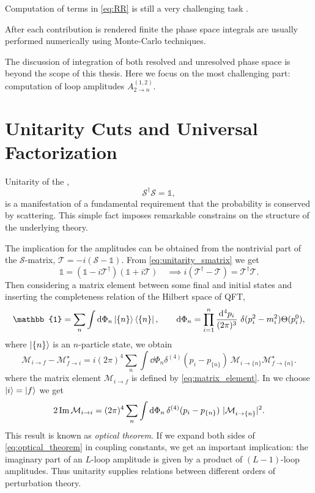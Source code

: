 Computation of terms in \eqref{eq:RR} is still a very challenging task .

After each contribution is rendered finite the phase space integrals are usually performed numerically using Monte-Carlo techniques.

The discussion of integration of both resolved and unresolved phase space is beyond the scope of this thesis.
Here we focus on the most challenging part:
computation of loop amplitudes $A^{(1,2)}_{2\to n}$.

\section{Unitarity Cuts and Universal Factorization}
\label{sec:unitarity}

Unitarity of the \sma{},
\begin{equation} \label{eq:unitarity_smatrix}
  \mathcal{S}^\dagger \mathcal{S} = \mathbb{1},
\end{equation}
is a manifestation of a
fundamental requirement that the probability is conserved by scattering.
This simple fact imposes remarkable constrains on the structure of the underlying theory.

The implication for the amplitudes can be obtained from the nontrivial part 
of the $\mathcal{S}$-matrix, $\mathcal{T} = -i(\mathcal{S}-\mathbb{1})$.
From \cref{eq:unitarity_smatrix} we get
\begin{equation}
  \mathbb{1} = (\mathbb{1}-i\mathcal{T}^\dagger)(\mathbb{1}+i\mathcal{T}) \quad\implies i(\mathcal{T}^\dagger- \mathcal{T}) = \mathcal{T}^\dagger\mathcal{T}.
\end{equation}
Then considering a matrix element between some final and initial states
and inserting the completeness relation of the Hilbert space of QFT,
\begin{equation}
  \mathbb{1} = \sum_n\int \dd{\Phi_n} \ket{\{n\}}\bra{\{n\}},    \qquad \dd{\Phi_n}=\prod_{i=1}^{n}\frac{\dd^4{p_i} }{(2\pi)^3} ~\delta(p_i^2-m_i^2) \Theta(p_i^{0}),
\end{equation}
where $\ket{\{n\}}$ is an $n$-particle state, we obtain
\begin{equation}
  \mathcal{M}_{i\to f} - \mathcal{M}_{f \to i}^\star = i (2\pi)^4 \sum_n \int \dd{\Phi_n} \delta^{(4)} (p_i - p_{\{n\}}) ~ \mathcal{M}_{i \to \{n\}}^{\phantom{\star}} \mathcal{M}^\star_{f \to \{n\}}.
\end{equation}
where the matrix element $\mathcal{M}_{i \to f}$ is defined by \cref{eq:matrix_element}. 
In we choose $\ket{i} = \ket{f}$ we get 
\begin{equation} \label{eq:optical_theorem}
  2 \Im\mathcal{M}_{i\to i} = (2\pi)^4 \sum_n \int \dd{\Phi_n} \delta^{(4)} (p_i - p_{\{n\}}) ~ \vert \mathcal{M}_{i \to \{n\}}^{\phantom{\star}} \vert^2.
\end{equation}
This result is known as \emph{optical theorem}. 
If we expand both sides of \cref{eq:optical_theorem} in coupling constants, we get an important
implication: the imaginary part of an $L$-loop amplitude is given by a product of $(L-1)$-loop amplitudes.
Thus unitarity supplies relations between different orders of perturbation theory.

